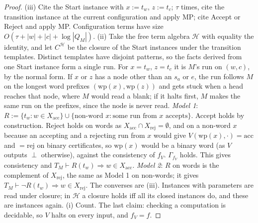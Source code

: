 \begin{proof}
(iii) Cite the Start instance with $x:=t_w$, $z:=t_c$; $\tau$ times, cite the transition instance at the current configuration and apply MP; cite Accept or Reject and apply MP. Configuration terms have size $O(\tau+|w|+|c|+\log|Q_M|)$.
(ii) Take the free term algebra $\mathcal H$ with equality the identity, and let $C^{\mathcal H}$ be the closure of the Start instances under the transition templates. Distinct templates have disjoint patterns, so the facts derived from one Start instance form a single run. For $x=t_w$, $z=t_c$ it is $M$'s run on $(w,c)$, by the normal form. If $x$ or $z$ has a node other than an $s_a$ or $e$, the run follows $M$ on the longest word prefixes $(\mathrm{wp}(x),\mathrm{wp}(z))$ and gets stuck when a head reaches that node, where $M$ would read a blank; if it halts first, $M$ makes the same run on the prefixes, since the node is never read. \emph{Model 1}: $R:=\{t_w:w\in X_{\mathrm{acc}}\}\cup\{\text{non-word }x:\text{some run from }x\text{ accepts}\}$. Accept holds by construction. Reject holds on words as $X_{\mathrm{acc}}\cap X_{\mathrm{rej}}=\emptyset$, and on a non-word $x$ because an accepting and a rejecting run from $x$ would give $V(\mathrm{wp}(x),\cdot)=\mathrm{acc}$ and $=\mathrm{rej}$ on binary certificates, so $\mathrm{wp}(x)$ would be a binary word (as $V$ outputs $\perp$ otherwise), against the consistency of $f_V$. $\Gamma_{f_V}$ holds. This gives consistency and $T_M\vdash R(t_w)\Rightarrow w\in X_{\mathrm{acc}}$. \emph{Model 2}: $R$ on words is the complement of $X_{\mathrm{rej}}$, the same as Model 1 on non-words; it gives $T_M\vdash\neg R(t_w)\Rightarrow w\in X_{\mathrm{rej}}$. The converses are (iii). Instances with parameters are read under closure; in $\mathcal H$ a closure holds iff all its closed instances do, and these are instances again.
(i) Count. The last claim: checking a computation is decidable, so $V$ halts on every input, and $f_V=f$.
\end{proof}

